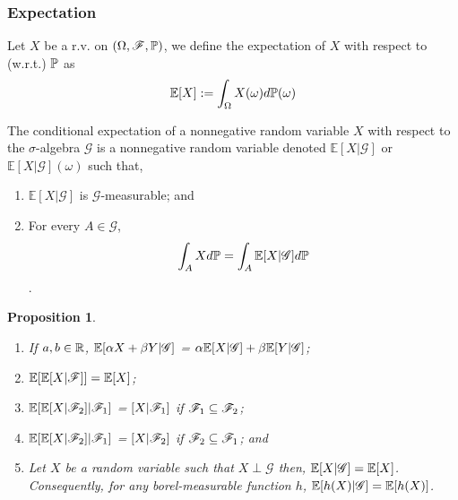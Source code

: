 \documentclass{beamer}
\newtheorem{proposition}{Proposition}[section]
\begin{document}
\begin{frame}
\frametitle{Expectation}
	\begin{definition}
		Let $X$ be a r.v. on $(\Omega, \mathscr{F}, \mathbb{P})$, we define the expectation of $X$ with respect to (w.r.t.) $\mathbb{P}$ as
		\[
			\mathbb{E}[X] := \int_\Omega X(\omega) d\mathbb{P}(\omega)
		\]
	\end{definition}
	
	\begin{definition}
The conditional expectation of a nonnegative random variable $X$ with respect to the $\sigma$-algebra $\mathscr{G}$ is a nonnegative random variable denoted $\mathbb{E}[X | \mathscr{G}]$ or $\mathbb{E}[X | \mathscr{G}](\omega)$ such that,
\begin{enumerate}
	\item $\mathbb{E}[X | \mathscr{G}]$ is $\mathscr{G}$-measurable; and
	\item For every $A \in \mathscr{G}$,
	\[\int_A X d\mathbb{P} = \int_A \mathbb{E}[X | \mathscr{G}] d\mathbb{P}\].
\end{enumerate}
\end{definition}
\end{frame}

\begin{frame}
\begin{proposition}
	\begin{enumerate}
		\item If $a, b \in \mathbb{R}$, $\mathbb{E}[\alpha X + \beta Y | \mathscr{G}]$ = $\alpha \mathbb{E}[X | \mathscr{G}] + \beta\mathbb{E}[Y | \mathscr{G}]$;
		\item $\mathbb{E}[\mathbb{E}[X | \mathscr{F}]] = \mathbb{E}[X]$;
		\item $\mathbb{E}[\mathbb{E}[X | \mathscr{F}_2] | \mathscr{F}_1]$ = $[X | \mathscr{F}_1]$ if $\mathscr{F}_1 \subseteq \mathscr{F}_2$;
		\item $\mathbb{E}[\mathbb{E}[X | \mathscr{F}_2] | \mathscr{F}_1]$ = $[X | \mathscr{F}_2]$ if $\mathscr{F}_2 \subseteq \mathscr{F}_1$; and
		\item Let $X$ be a random variable such that $X \perp \mathscr{G}$ then, $\mathbb{E}[X|\mathscr{G}] = \mathbb{E}[X]$. Consequently, for any borel-measurable function $h$, $\mathbb{E}[h(X)|\mathscr{G}] = \mathbb{E}[h(X)]$.
	\end{enumerate}
\end{proposition}
\end{frame}
\end{document}
